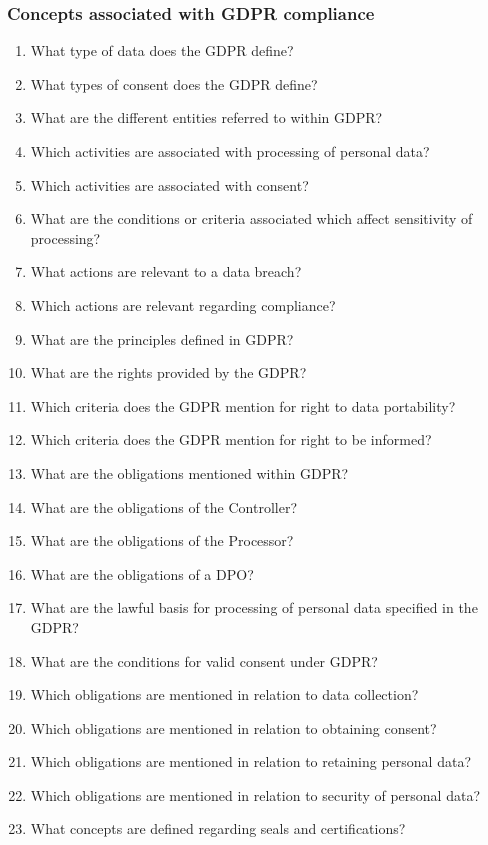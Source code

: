 \subsubsection{Concepts associated with GDPR compliance}
\begin{enumerate}[label={\texttt{CQ.\theenumi}},resume]
    \item What type of data does the GDPR define?
    \item What types of consent does the GDPR define?
    \item What are the different entities referred to within GDPR?
    \item Which activities are associated with processing of personal data?
    \item Which activities are associated with consent?
    \item What are the conditions or criteria associated which affect sensitivity of processing?
    \item What actions are relevant to a data breach?
    \item Which actions are relevant regarding compliance?
    \item What are the principles defined in GDPR?
    \item What are the rights provided by the GDPR?
    \item Which criteria does the GDPR mention for right to data portability?
    \item Which criteria does the GDPR mention for right to be informed?
    \item What are the obligations mentioned within GDPR?
    \item What are the obligations of the Controller?
    \item What are the obligations of the Processor?
    \item What are the obligations of a DPO?
    \item What are the lawful basis for processing of personal data specified in the GDPR?
    \item What are the conditions for valid consent under GDPR?
    \item Which obligations are mentioned in relation to data collection?
    \item Which obligations are mentioned in relation to obtaining consent?
    \item Which obligations are mentioned in relation to retaining personal data?
    \item Which obligations are mentioned in relation to security of personal data?
    \item What concepts are defined regarding seals and certifications?
\end{enumerate}

